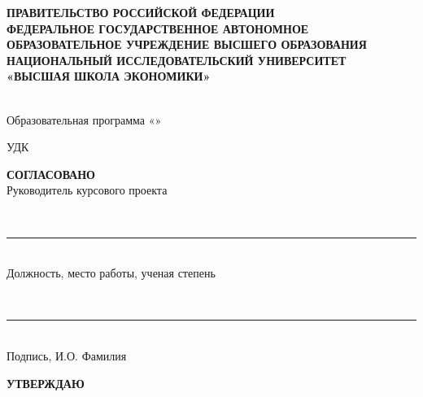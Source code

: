 \begin{titlepage}
\thispagestyle{empty}
\singlespacing
\footnotesize
\setlength{\parindent}{0pt}
\setlength{\parskip}{0pt}


\begin{center}
\textbf{ПРАВИТЕЛЬСТВО РОССИЙСКОЙ ФЕДЕРАЦИИ}\\
\textbf{ФЕДЕРАЛЬНОЕ ГОСУДАРСТВЕННОЕ АВТОНОМНОЕ}\\
\textbf{ОБРАЗОВАТЕЛЬНОЕ УЧРЕЖДЕНИЕ ВЫСШЕГО ОБРАЗОВАНИЯ}\\
\textbf{НАЦИОНАЛЬНЫЙ ИССЛЕДОВАТЕЛЬСКИЙ УНИВЕРСИТЕТ}\\
\textbf{«ВЫСШАЯ ШКОЛА ЭКОНОМИКИ»}

\vspace{0.35cm}
\hseFaculty\\
Образовательная программа «\hseSpecialization»
\end{center}

\vspace{0.25cm}
\noindent
УДК~\hseUDC

\vspace{0.4cm}
\noindent
\begin{minipage}[t]{0.46\textwidth}
\raggedright
\textbf{СОГЛАСОВАНО}\\
Руководитель курсового проекта

\vspace{0.15cm}
\strut\hseSupervisorTitle\\[-0.05cm]
\rule{6cm}{0.4pt}\\[-0.05cm]
{\scriptsize Должность, место работы, ученая степень}

\vspace{0.12cm}
\strut\hseSupervisorName\\[-0.05cm]
\rule{6cm}{0.4pt}\\[-0.05cm]
{\scriptsize Подпись, И.О. Фамилия}

\vspace{0.1cm}
\signdateblank
\end{minipage}
\hfill
\begin{minipage}[t]{0.46\textwidth}
\raggedright
\textbf{УТВЕРЖДАЮ}\\
\strut\hseAcademicSupervisorTitle


\end{minipage}
\end{titlepage}

